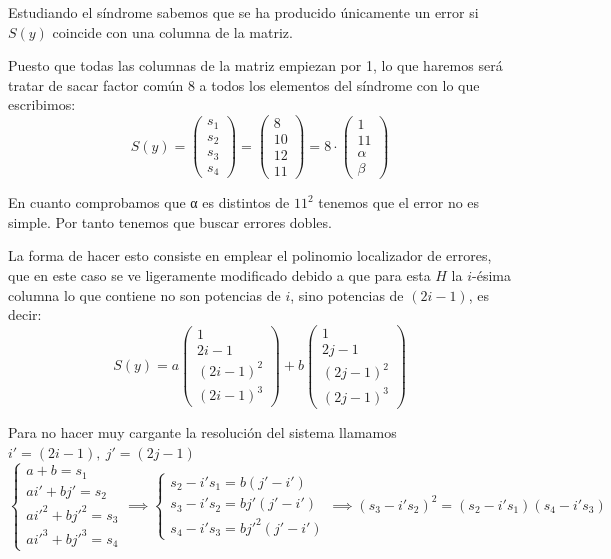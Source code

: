 \begin{problem}[13]
Estudiando el síndrome sabemos que se ha producido únicamente un error si $S(y)$ coincide con una columna de la matriz.

Puesto que todas las columnas de la matriz empiezan por 1, lo que haremos será tratar de sacar factor común 8 a todos los elementos del síndrome con lo que escribimos:
\[S(y) = \left( \begin{array}{c}s_1 \\ s_2 \\ s_3 \\ s_4 \end{array}\right) = \left( \begin{array}{c}8 \\ 10 \\ 12 \\ 11 \end{array}\right) = 8\cdot \left( \begin{array}{c}1 \\ 11 \\ α \\ β \end{array}\right)\]

En cuanto comprobamos que α es distintos de $11^2$ tenemos que el error no es simple. Por tanto tenemos que buscar errores dobles.

La forma de hacer esto consiste en emplear el polinomio localizador de errores, que en este caso se ve ligeramente modificado debido a que para esta $H$ la $i$-ésima columna lo que contiene no son potencias de $i$, sino potencias de $(2i - 1)$, es decir:
\begin{equation}
\label{eq:ejrc13b-hoja4}
	S(y)=
	a\left( \begin{array}{c}1 \\ 2i-1 \\ (2i-1)^2 \\ (2i-1)^3 \end{array}\right) +
	b\left( \begin{array}{c}1 \\ 2j-1 \\ (2j-1)^2 \\ (2j-1)^3 \end{array}\right) 
\end{equation}

Para no hacer muy cargante la resolución del sistema llamamos $i'=(2i-1),\ j'=(2j-1)$
\[\left\{ \begin{array}{l}
a+b=s_1\\
ai'+bj'=s_2\\
ai'^2+bj'^2=s_3\\
ai'^3+bj'^3=s_4
\end{array}\right. \implies \left\{ \begin{array}{l}
s_2 - i's_1 = b(j' - i')\\
s_3 - i's_2 = bj'(j' - i')\\
s_4 - i's_3 = bj'^2(j' - i')
\end{array}\right. \implies (s_3 - i's_2)^2 = (s_2 - i's_1)(s_4 - i's_3)\]


\end{problem}
